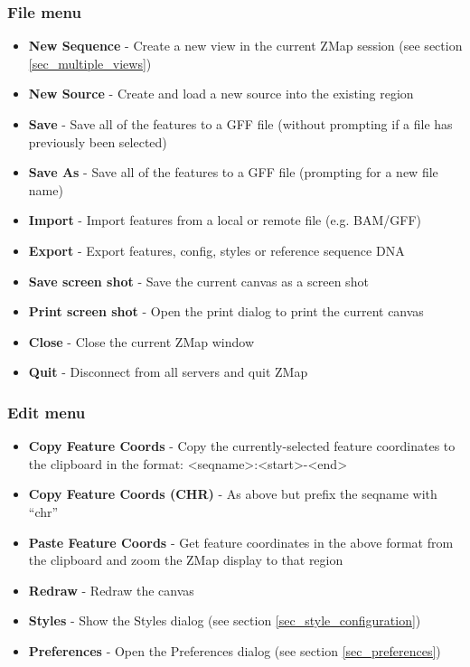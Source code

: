 \documentclass[letterpaper]{article}
\begin{document}
\subsubsection{File menu}
\begin{itemize}
\item \textbf{New Sequence} - Create a new view in the current ZMap session (see section \ref{sec_multiple_views})
\item \textbf{New Source} - Create and load a new source into the existing region
\item \textbf{Save} - Save all of the features to a GFF file (without prompting if a file has previously been selected)
\item \textbf{Save As} - Save all of the features to a GFF file (prompting for a new file name)
\item \textbf{Import} - Import features from a local or remote file (e.g. BAM/GFF)
\item \textbf{Export} - Export features, config, styles or reference sequence DNA
\item \textbf{Save screen shot} - Save the current canvas as a screen shot
\item \textbf{Print screen shot} - Open the print dialog to print the current canvas
\item \textbf{Close} - Close the current ZMap window
\item \textbf{Quit} - Disconnect from all servers and quit ZMap
\end{itemize}

\subsubsection{Edit menu}
\begin{itemize}
\item \textbf{Copy Feature Coords} - Copy the currently-selected feature coordinates to the clipboard in the format: <seqname>:<start>-<end>
\item \textbf{Copy Feature Coords (CHR)} - As above but prefix the seqname with ``chr''
\item \textbf{Paste Feature Coords} - Get feature coordinates in the above format from the clipboard and zoom the ZMap display to that region
\item \textbf{Redraw} - Redraw the canvas
\item \textbf{Styles} - Show the Styles dialog (see section \ref{sec_style_configuration})
\item \textbf{Preferences} - Open the Preferences dialog (see section \ref{sec_preferences})
\end{itemize}
\end{document}

